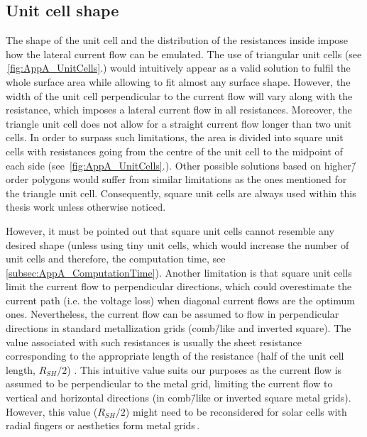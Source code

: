 \subsection{Unit cell shape}
The shape of the unit cell and the distribution of the resistances inside impose how the lateral current flow can be emulated. The use of triangular unit cells (see \fig\,\ref{fig:AppA_UnitCells}.) would intuitively appear as a valid solution to fulfil the whole surface area while allowing to fit almost any surface shape. However, the width of the unit cell perpendicular to the current flow will vary along with the resistance, which imposes a lateral current flow in all resistances. Moreover, the triangle unit cell does not allow for a straight current flow longer than two unit cells. In order to surpass such limitations, the area is divided into square unit cells with resistances going from the centre of the unit cell to the midpoint of each side (see \fig\,\ref{fig:AppA_UnitCells}.). Other possible solutions based on higher\=/order polygons would suffer from similar limitations as the ones mentioned for the triangle unit cell. Consequently, square unit cells are always used within this thesis work unless otherwise noticed.

However, it must be pointed out that square unit cells cannot resemble any desired shape (unless using tiny unit cells, which would increase the number of unit cells and therefore, the computation time, see \sect\,\ref{subsec:AppA_ComputationTime}). Another limitation is that square unit cells limit the current flow to perpendicular directions, which could overestimate the current path (i.e. the voltage loss) when diagonal current flows are the optimum ones. Nevertheless, the current flow can be assumed to flow in perpendicular directions in standard metallization grids (comb\=/like and inverted square). The value associated with such resistances is usually the sheet resistance corresponding to the appropriate length of the resistance (half of the unit cell length, $R_{SH}/2$) \cite{Antonini2003,Galiana2005,Haas2014}. This intuitive value suits our purposes as the current flow is assumed to be perpendicular to the metal grid, limiting the current flow to vertical and horizontal directions (in comb\=/like or inverted square metal grids). However, this value ($R_{SH}/2$) might need to be reconsidered for solar cells with radial fingers or aesthetics form metal grids\,\cite{Gupta2016}.

